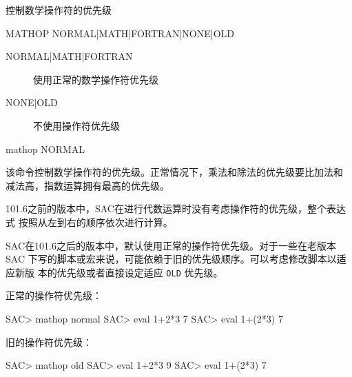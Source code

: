\label{cmd:mathop}

控制数学操作符的优先级

\begin{SACSTX}
MATHOP NORMAL|MATH|FORTRAN|NONE|OLD
\end{SACSTX}

\begin{description}
\item [NORMAL|MATH|FORTRAN] 使用正常的数学操作符优先级
\item [NONE|OLD] 不使用操作符优先级
\end{description}

\begin{SACDFT}
mathop NORMAL
\end{SACDFT}

该命令控制数学操作符的优先级。正常情况下，乘法和除法的优先级要比加法和
减法高，指数运算拥有最高的优先级。

101.6之前的版本中，SAC在进行代数运算时没有考虑操作符的优先级，整个表达式
按照从左到右的顺序依次进行计算。

SAC在101.6之后的版本中，默认使用正常的操作符优先级。对于一些在老版本SAC
下写的脚本或宏来说，可能依赖于旧的优先级顺序。可以考虑修改脚本以适应新版
本的优先级或者直接设定适应 \texttt{OLD} 优先级。

正常的操作符优先级：
\begin{SACCode}
SAC> mathop normal
SAC> eval 1+2*3
 7
SAC> eval 1+(2*3)
 7
\end{SACCode}

旧的操作符优先级：
\begin{SACCode}
SAC> mathop old
SAC> eval 1+2*3
 9
SAC> eval 1+(2*3)
 7
\end{SACCode}
